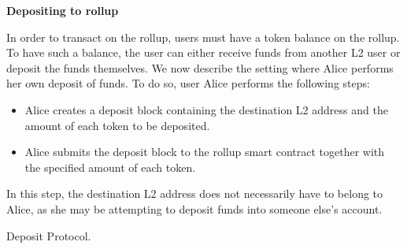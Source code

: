 \begin{Protocol*}[!h]
\begin{mdframed}

\fontsize{10pt}{2cm}

\begin{center}
    \textbf{Depositing to rollup}
\end{center}
\smallbreak
In order to transact on the rollup, users must have a token balance on the rollup. To have such a balance, the user can either receive funds from another L2 user or deposit the funds themselves. We now describe the setting where Alice performs her own deposit of funds. To do so, user Alice performs the following steps:

\begin{itemize}
  \setlength\itemsep{0.25em}

    \item Alice creates a deposit block containing the destination L2 address and the amount of each token to be deposited. 

    \item Alice submits the deposit block to the rollup smart contract together with the specified amount of each token. 
\end{itemize}


In this step, the destination L2 address does not necessarily have to belong to Alice, as she may be attempting to deposit funds into someone else's account. 

\end{mdframed}
\caption{Deposit Protocol.\label{alg:deposit}}
\end{Protocol*}